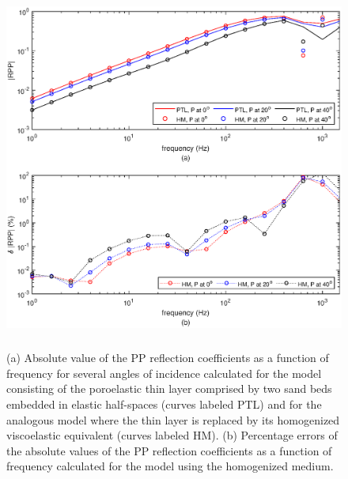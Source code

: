 \documentclass[draft]{agujournal2019}
\begin{document}
\begin{figure}[!ht]
\centering
        \includegraphics[width= 130mm, height=120mm]{Figure3.eps}
\caption{ (a) Absolute value of the PP reflection coefficients as a function of frequency for several angles of incidence calculated for the model consisting of the poroelastic thin layer comprised by two sand beds embedded in elastic half-spaces (curves labeled PTL) and for the analogous model where the thin layer is replaced by its homogenized viscoelastic equivalent (curves labeled HM). (b) Percentage errors of the absolute values of the PP reflection coefficients as a function of frequency calculated for the model using the homogenized medium.}
\label{fig.3}
\end{figure}
\end{document}

